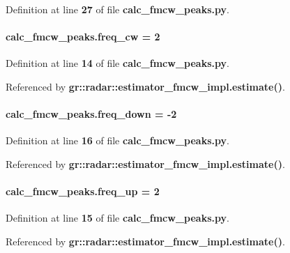 Definition at line {\bf 27} of file {\bf calc\+\_\+fmcw\+\_\+peaks.\+py}.

\paragraph[{freq\+\_\+cw}]{ calc\+\_\+fmcw\+\_\+peaks.\+freq\+\_\+cw = 2}\label{namespacecalc__fmcw__peaks_ac13b5c1b8ad8ae55a159191554589676}


Definition at line {\bf 14} of file {\bf calc\+\_\+fmcw\+\_\+peaks.\+py}.



Referenced by {\bf gr\+::radar\+::estimator\+\_\+fmcw\+\_\+impl.\+estimate()}.

\paragraph[{freq\+\_\+down}]{ calc\+\_\+fmcw\+\_\+peaks.\+freq\+\_\+down = -\/2}\label{namespacecalc__fmcw__peaks_a6d9fa2973f29fd1c67517ed5686d642a}


Definition at line {\bf 16} of file {\bf calc\+\_\+fmcw\+\_\+peaks.\+py}.



Referenced by {\bf gr\+::radar\+::estimator\+\_\+fmcw\+\_\+impl.\+estimate()}.

\paragraph[{freq\+\_\+up}]{ calc\+\_\+fmcw\+\_\+peaks.\+freq\+\_\+up = 2}\label{namespacecalc__fmcw__peaks_aa146d6f888ff5d183e45bd773dd78853}


Definition at line {\bf 15} of file {\bf calc\+\_\+fmcw\+\_\+peaks.\+py}.



Referenced by {\bf gr\+::radar\+::estimator\+\_\+fmcw\+\_\+impl.\+estimate()}.


